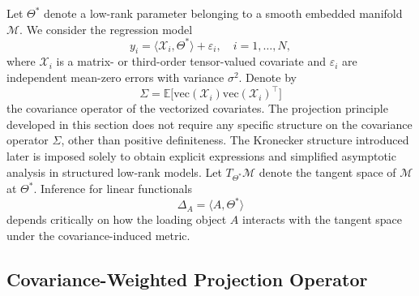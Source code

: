 \documentclass[authoryear,preprint,review,12pt]{elsarticle}
\begin{document}
	Let $\Theta^\ast$ denote a low-rank parameter
	belonging to a smooth embedded manifold $\mathcal{M}$.
	We consider the regression model
	\begin{equation}\label{eq1}
		y_i = \langle \mathcal{X}_i, \Theta^\ast \rangle + \varepsilon_i,
		\quad i=1,\dots,N,
	\end{equation}
	where $\mathcal{X}_i$ is a matrix- or third-order tensor-valued covariate
	and $\varepsilon_i$ are independent mean-zero errors with variance $\sigma^2$. 
	Denote by
	\[
	\Sigma = \mathbb{E}\big[ \mathrm{vec}(\mathcal{X}_i)
	\mathrm{vec}(\mathcal{X}_i)^\top \big]
	\]
	the covariance operator of the vectorized covariates. 
	The projection principle developed in this section does not require any specific structure on the covariance operator $\Sigma$, 
	other than positive definiteness. 
	The Kronecker structure introduced later is imposed solely to obtain explicit expressions and simplified asymptotic analysis in structured low-rank models. 
	Let $T_{\Theta^\ast}\mathcal{M}$ denote the tangent space of $\mathcal{M}$
	at $\Theta^\ast$.
	Inference for linear functionals
	\[
	\Delta_A = \langle A, \Theta^\ast \rangle
	\]
	depends critically on how the loading object $A$
	interacts with the tangent space under the covariance-induced metric. 
	
	
	
	\subsection{Covariance-Weighted Projection Operator}
	
\end{document}
